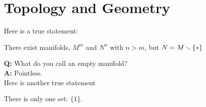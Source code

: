 \setcounter{section}{0}

\section{Topology and Geometry}
Here is a true statement:
\begin{center}
  There exist manifolds, $M^m$ and $N^n$ with $n>m$, 
  but $N = M\smallsetminus \{\ast\}$
\end{center}

\textbf{Q:} What do you call an empty manifold?\\
\textbf{A:} Pointless.\\

Here is another true statement
\begin{center}
  There is only one set: $\{1\}$.
\end{center}

